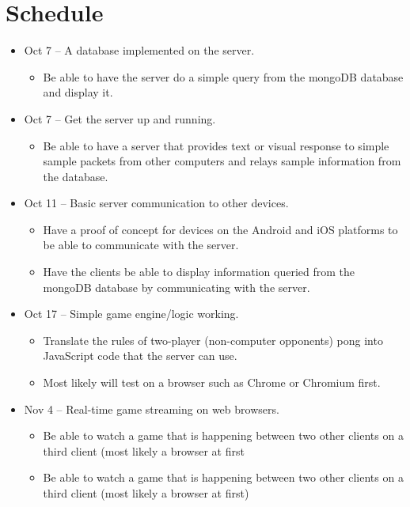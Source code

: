 \documentclass[letterpaper,12pt]{article}
\begin{document}
\section{Schedule}
\begin{itemize}
	\item Oct 7 -- A database implemented on the server.
	\begin{itemize}
		\item  Be able to have the server do a simple query from the mongoDB database and display it.
	\end{itemize}
	\item Oct 7 -- Get the server up and running. 
	\begin{itemize}
		\item Be able to have a server that provides text or visual response to simple sample packets from other computers and relays sample information from the database.
	\end{itemize}
	\item Oct 11 -- Basic server communication to other devices. 
	\begin{itemize}
		\item Have a proof of concept for devices on the Android and iOS platforms to be able to communicate with the server. 
		\item Have the clients be able to display information queried from the mongoDB database by communicating with the server.
	\end{itemize}
	\item Oct 17 -- Simple game engine/logic working.
	\begin{itemize}
		\item Translate the rules of two-player (non-computer opponents) pong into JavaScript code that the server can use.
		\item Most likely will test on a browser such as Chrome or Chromium first.
	\end{itemize}
	\item Nov 4 -- Real-time game streaming on web browsers.
	\begin{itemize}
		\item Be able to watch a game that is happening between two other clients on a third client (most likely a browser at first
			\item Be able to watch a game that is happening between two other clients on a third client (most likely a browser at first)
	\end{itemize}
\end{itemize}
\end{document}
